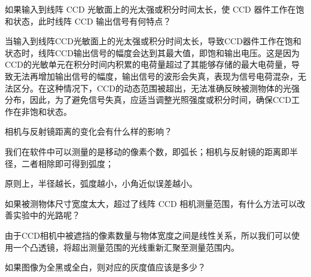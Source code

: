\documentclass[dvipsnames, svgnames,a4paper,11pt]{article}
\begin{document}
\begin{question}
	如果输入到线阵 CCD 光敏面上的光太强或积分时间太长，使 CCD 器件工作在饱和状态，此时线阵 CCD 输出信号有何特点？
\end{question}

	当输入到线阵CCD光敏面上的光太强或积分时间太长，导致CCD器件工作在饱和状态时，线阵CCD输出信号的幅度会达到其最大值，即饱和输出电压。这是因为CCD的光敏单元在积分时间内积累的电荷量超过了其能够存储的最大电荷量，导致无法再增加输出信号的幅度，输出信号的波形会失真，表现为信号电荷混杂，无法区分。在这种情况下，CCD的动态范围被超出，无法准确反映被测物体的光强分布，因此，为了避免信号失真，应适当调整光照强度或积分时间，确保CCD工作在非饱和状态。











\begin{question}
	相机与反射镜距离的变化会有什么样的影响？
\end{question}

	我们在软件中可以测量的是移动的像素个数，即弧长；相机与反射镜的距离即半径，二者相除即可得到弧度；

	原则上，半径越长，弧度越小，小角近似误差越小。













\begin{question}
	如果被测物体尺寸宽度太大，超过了线阵 CCD 相机测量范围，有什么方法可以改善实验中的光路呢？
\end{question}

	由于CCD相机中被遮挡的像素数量与物体宽度之间是线性关系，所以我们可以使用一个凸透镜，将超出测量范围的光线重新汇聚至测量范围内。

















\begin{question}
	如果图像为全黑或全白，则对应的灰度值应该是多少？
\end{question}
\end{document}
